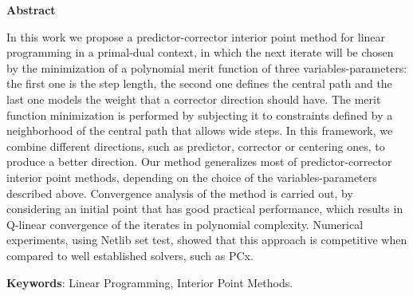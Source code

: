 \begin{center}
  \large{\textbf{Abstract}}
\end{center}




In this work we propose a predictor-corrector interior point method for linear programming in a primal-dual context, in which the next iterate will be chosen by the minimization of a polynomial merit function  of three variables-parameters: the first one is the step length, the second one defines the central path and the last one models the weight that a corrector direction should have. The merit function minimization is performed by subjecting it to constraints defined by a neighborhood of the central path that allows wide steps. In this framework, we combine  different directions, such as predictor, corrector or centering ones, to produce a better direction. Our method generalizes most of predictor-corrector interior point methods, depending on the choice of the variables-parameters described above. Convergence analysis of the method is carried out, by considering an initial point that has good practical performance, which results in Q-linear convergence of the iterates in polynomial complexity. Numerical experiments, using Netlib set test,  showed that this approach is competitive when compared to  well established solvers, such as PCx.





\vspace{.5cm}
\textbf{Keywords}:
Linear Programming, Interior Point Methods.
